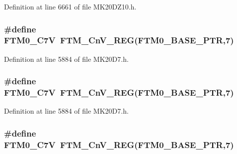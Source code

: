 Definition at line 6661 of file M\+K20\+D\+Z10.\+h.

\subsubsection[{\texorpdfstring{F\+T\+M0\+\_\+\+C7V}{FTM0_C7V}}]{\setlength{\rightskip}{0pt plus 5cm}\#define F\+T\+M0\+\_\+\+C7V~{\bf F\+T\+M\+\_\+\+Cn\+V\+\_\+\+R\+EG}({\bf F\+T\+M0\+\_\+\+B\+A\+S\+E\+\_\+\+P\+TR},7)}\hypertarget{group___f_t_m___register___accessor___macros_ga4c2b5900c5f35a54aee5610b5a7d12bf}{}\label{group___f_t_m___register___accessor___macros_ga4c2b5900c5f35a54aee5610b5a7d12bf}


Definition at line 5884 of file M\+K20\+D7.\+h.

\subsubsection[{\texorpdfstring{F\+T\+M0\+\_\+\+C7V}{FTM0_C7V}}]{\setlength{\rightskip}{0pt plus 5cm}\#define F\+T\+M0\+\_\+\+C7V~{\bf F\+T\+M\+\_\+\+Cn\+V\+\_\+\+R\+EG}({\bf F\+T\+M0\+\_\+\+B\+A\+S\+E\+\_\+\+P\+TR},7)}\hypertarget{group___f_t_m___register___accessor___macros_ga4c2b5900c5f35a54aee5610b5a7d12bf}{}\label{group___f_t_m___register___accessor___macros_ga4c2b5900c5f35a54aee5610b5a7d12bf}


Definition at line 5884 of file M\+K20\+D7.\+h.

\subsubsection[{\texorpdfstring{F\+T\+M0\+\_\+\+C7V}{FTM0_C7V}}]{\setlength{\rightskip}{0pt plus 5cm}\#define F\+T\+M0\+\_\+\+C7V~{\bf F\+T\+M\+\_\+\+Cn\+V\+\_\+\+R\+EG}({\bf F\+T\+M0\+\_\+\+B\+A\+S\+E\+\_\+\+P\+TR},7)}\hypertarget{group___f_t_m___register___accessor___macros_ga4c2b5900c5f35a54aee5610b5a7d12bf}{}\label{group___f_t_m___register___accessor___macros_ga4c2b5900c5f35a54aee5610b5a7d12bf}


